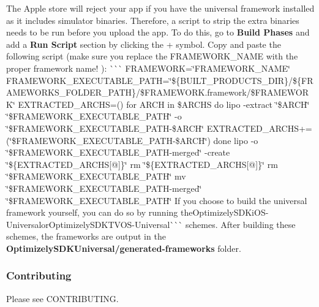 \begin{DoxyEnumerate}
\item The Apple store will reject your app if you have the universal framework installed as it includes simulator binaries. Therefore, a script to strip the extra binaries needs to be run before you upload the app. To do this, go to {\bfseries Build Phases} and add a {\bfseries Run Script} section by clicking the {\ttfamily +} symbol. Copy and paste the following script (make sure you replace the {\ttfamily F\+R\+A\+M\+E\+W\+O\+R\+K\+\_\+\+N\+A\+ME} with the proper framework name! )\+: \`{}\`{}\`{} F\+R\+A\+M\+E\+W\+O\+RK=\char`\"{}\+F\+R\+A\+M\+E\+W\+O\+R\+K\+\_\+\+N\+A\+M\+E\char`\"{} F\+R\+A\+M\+E\+W\+O\+R\+K\+\_\+\+E\+X\+E\+C\+U\+T\+A\+B\+L\+E\+\_\+\+P\+A\+TH=\char`\"{}\$\{\+B\+U\+I\+L\+T\+\_\+\+P\+R\+O\+D\+U\+C\+T\+S\+\_\+\+D\+I\+R\}/\$\{\+F\+R\+A\+M\+E\+W\+O\+R\+K\+S\+\_\+\+F\+O\+L\+D\+E\+R\+\_\+\+P\+A\+T\+H\}/\$\+F\+R\+A\+M\+E\+W\+O\+R\+K.\+framework/\$\+F\+R\+A\+M\+E\+W\+O\+R\+K\char`\"{} E\+X\+T\+R\+A\+C\+T\+E\+D\+\_\+\+A\+R\+C\+HS=() for A\+R\+CH in \$\+A\+R\+C\+HS do lipo -\/extract \char`\"{}\$\+A\+R\+C\+H\char`\"{} \char`\"{}\$\+F\+R\+A\+M\+E\+W\+O\+R\+K\+\_\+\+E\+X\+E\+C\+U\+T\+A\+B\+L\+E\+\_\+\+P\+A\+T\+H\char`\"{} -\/o \char`\"{}\$\+F\+R\+A\+M\+E\+W\+O\+R\+K\+\_\+\+E\+X\+E\+C\+U\+T\+A\+B\+L\+E\+\_\+\+P\+A\+T\+H-\/\$\+A\+R\+C\+H\char`\"{} E\+X\+T\+R\+A\+C\+T\+E\+D\+\_\+\+A\+R\+C\+H\+S+=(\char`\"{}\$\+F\+R\+A\+M\+E\+W\+O\+R\+K\+\_\+\+E\+X\+E\+C\+U\+T\+A\+B\+L\+E\+\_\+\+P\+A\+T\+H-\/\$\+A\+R\+C\+H\char`\"{}) done lipo -\/o \char`\"{}\$\+F\+R\+A\+M\+E\+W\+O\+R\+K\+\_\+\+E\+X\+E\+C\+U\+T\+A\+B\+L\+E\+\_\+\+P\+A\+T\+H-\/merged\char`\"{} -\/create \char`\"{}\$\{\+E\+X\+T\+R\+A\+C\+T\+E\+D\+\_\+\+A\+R\+C\+H\+S\mbox{[}@\mbox{]}\}\char`\"{} rm \char`\"{}\$\{\+E\+X\+T\+R\+A\+C\+T\+E\+D\+\_\+\+A\+R\+C\+H\+S\mbox{[}@\mbox{]}\}\char`\"{} rm \char`\"{}\$\+F\+R\+A\+M\+E\+W\+O\+R\+K\+\_\+\+E\+X\+E\+C\+U\+T\+A\+B\+L\+E\+\_\+\+P\+A\+T\+H\char`\"{} mv \char`\"{}\$\+F\+R\+A\+M\+E\+W\+O\+R\+K\+\_\+\+E\+X\+E\+C\+U\+T\+A\+B\+L\+E\+\_\+\+P\+A\+T\+H-\/merged\char`\"{} \char`\"{}\$\+F\+R\+A\+M\+E\+W\+O\+R\+K\+\_\+\+E\+X\+E\+C\+U\+T\+A\+B\+L\+E\+\_\+\+P\+A\+T\+H\char`\"{} {\ttfamily  If you choose to build the universal framework yourself, you can do so by running the}Optimizely\+S\+D\+Ki\+O\+S-\/\+Universal{\ttfamily or}Optimizely\+S\+D\+K\+T\+V\+O\+S-\/\+Universal\`{}\`{}\`{} schemes. After building these schemes, the frameworks are output in the {\bfseries Optimizely\+S\+D\+K\+Universal/generated-\/frameworks} folder.
\end{DoxyEnumerate}

\subsubsection*{Contributing}

Please see C\+O\+N\+T\+R\+I\+B\+U\+T\+I\+NG. 